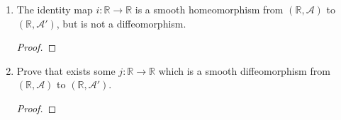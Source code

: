 \documentclass{article}
\begin{document}
\begin{enumerate}[label={\bf Q\arabic*:}]
    \begin{enumerate}
      \item The identity map $i:\mathbb{R}\rightarrow\mathbb{R}$ is a
        smooth homeomorphism from $(\mathbb{R},\mathcal{A})$ to
        $(\mathbb{R},\mathcal{A}')$, but is not a diffeomorphism.

        \begin{proof}
        \end{proof}

      \item Prove that exists some $j:\mathbb{R}\rightarrow\mathbb{R}$
        which is a smooth diffeomorphism from $(\mathbb{R},\mathcal{A})$ to
        $(\mathbb{R},\mathcal{A}')$.

        \begin{proof}
        \end{proof}
    \end{enumerate}
\end{enumerate}
\end{document}
